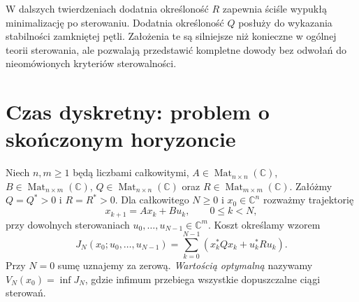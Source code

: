 \begin{uwaga}
\label{rem:lin24-hypotheses}
W dalszych twierdzeniach
dodatnia określoność \(R\)
zapewnia ściśle wypukłą
minimalizację po sterowaniu.
Dodatnia określoność \(Q\)
posłuży do wykazania
stabilności zamkniętej pętli.
Założenia te są silniejsze
niż konieczne w ogólnej teorii
sterowania, ale pozwalają
przedstawić kompletne dowody
bez odwołań do nieomówionych
kryteriów sterowalności.
\end{uwaga}

\section{Czas dyskretny: problem o skończonym horyzoncie}
\label{sec:lin24-discrete-finite}

\begin{definicja}
\label{def:lin24-discrete-cost}
Niech \(n,m\ge1\) będą liczbami całkowitymi,
\(A\in\operatorname{Mat}_{n\times n}(\mathbb C)\),
\(B\in\operatorname{Mat}_{n\times m}(\mathbb C)\),
\(Q\in\operatorname{Mat}_{n\times n}(\mathbb C)\)
oraz \(R\in\operatorname{Mat}_{m\times m}(\mathbb C)\).
Załóżmy \(Q=Q^*>0\) i \(R=R^*>0\).
Dla całkowitego \(N\ge0\)
i \(x_0\in\mathbb C^n\)
rozważmy trajektorię
\[
 x_{k+1}=Ax_k+Bu_k,\qquad 0\le k<N,
\]
przy dowolnych sterowaniach
\(u_0,\ldots,u_{N-1}\in\mathbb C^m\).
Koszt określamy wzorem
\[
 J_N(x_0;u_0,\ldots,u_{N-1})
  =\sum_{k=0}^{N-1}
         (x_k^*Qx_k+u_k^*Ru_k).
\]
Przy \(N=0\) sumę uznajemy
za zerową. \emph{Wartością optymalną}
nazywamy
\(V_N(x_0)=\inf J_N\),
gdzie infimum przebiega
wszystkie dopuszczalne ciągi
sterowań.
\end{definicja}

